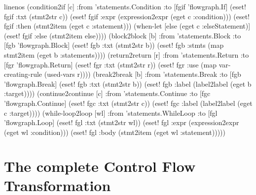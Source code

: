 \documentclass[submission]{eptcs}
\begin{document}
\begin{clojurecode*}{linenos}
  (condition2if [c]
      :from 'statements.Condition
      :to [fgif 'flowgraph.If]
      (eset! fgif :txt (stmt2str c))
      (eset! fgif :expr (expression2expr (eget c :condition)))
      (eset! fgif :then (stmt2item (eget c :statement)))
      (when-let [else (eget c :elseStatement)]
        (eset! fgif :else (stmt2item else))))
  (block2block [b]
      :from 'statements.Block
      :to [fgb 'flowgraph.Block]
      (eset! fgb :txt (stmt2str b))
      (eset! fgb :stmts (map stmt2item (eget b :statements))))
  (return2return [r]
      :from 'statements.Return
      :to [fgr 'flowgraph.Return]
      (eset! fgr :txt (stmt2str r))
      (eset! fgr :use (map var-creating-rule (used-vars r))))
  (break2break [b]
      :from 'statements.Break
      :to [fgb 'flowgraph.Break]
      (eset! fgb :txt (stmt2str b))
      (eset! fgb :label (label2label (eget b :target))))
  (continue2continue [c]
      :from 'statements.Continue
      :to [fgc 'flowgraph.Continue]
      (eset! fgc :txt (stmt2str c))
      (eset! fgc :label (label2label (eget c :target))))
  (while-loop2loop [wl]
      :from 'statements.WhileLoop
      :to   [fgl 'flowgraph.Loop]
      (eset! fgl :txt (stmt2str wl))
      (eset! fgl :expr (expression2expr (eget wl :condition)))
      (eset! fgl :body (stmt2item (eget wl :statement)))))
\end{clojurecode*}

\section{The complete Control Flow Transformation}
\label{sec:compl-contr-flow}
\end{document}
